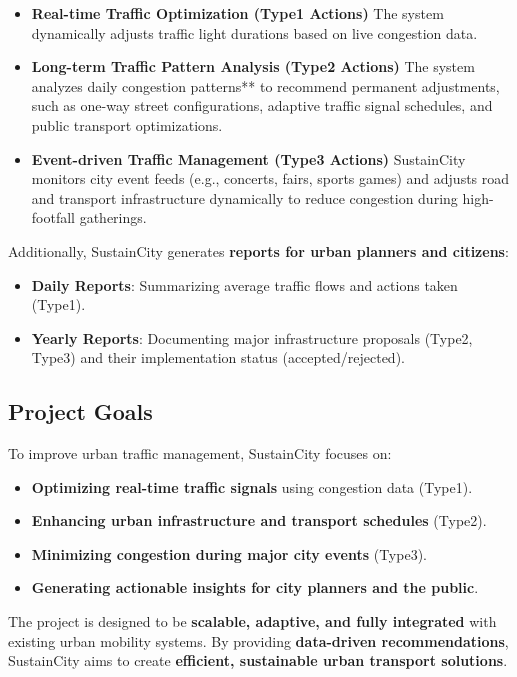 \documentclass[a4paper,12pt]{article}
\begin{document}
\begin{itemize}
    \item \textbf{Real-time Traffic Optimization (Type1 Actions)} 
    The system dynamically adjusts traffic light durations based on live congestion data.  

    \item \textbf{Long-term Traffic Pattern Analysis (Type2 Actions)}  
    The system analyzes daily congestion patterns** to recommend permanent adjustments, such as one-way street configurations, adaptive traffic signal schedules, and public transport optimizations.

    \item \textbf{Event-driven Traffic Management (Type3 Actions)}
    SustainCity monitors city event feeds (e.g., concerts, fairs, sports games) and adjusts road and transport infrastructure dynamically to reduce congestion during high-footfall gatherings.
\end{itemize}

\noindent Additionally, SustainCity generates \textbf{reports for urban planners and citizens}:
\begin{itemize}
    \item \textbf{Daily Reports}: Summarizing average traffic flows and actions taken (Type1).
    \item \textbf{Yearly Reports}: Documenting major infrastructure proposals (Type2, Type3) and their implementation status (accepted/rejected).
\end{itemize}

\subsection{Project Goals}
To improve urban traffic management, SustainCity focuses on:
\begin{itemize}
    \item \textbf{Optimizing real-time traffic signals} using congestion data (Type1).
    \item \textbf{Enhancing urban infrastructure and transport schedules} (Type2).
    \item \textbf{Minimizing congestion during major city events} (Type3).
    \item \textbf{Generating actionable insights for city planners and the public}.
\end{itemize}

The project is designed to be \textbf{scalable, adaptive, and fully integrated} with existing urban mobility systems. By providing \textbf{data-driven recommendations}, SustainCity aims to create \textbf{efficient, sustainable urban transport solutions}.
\end{document}
